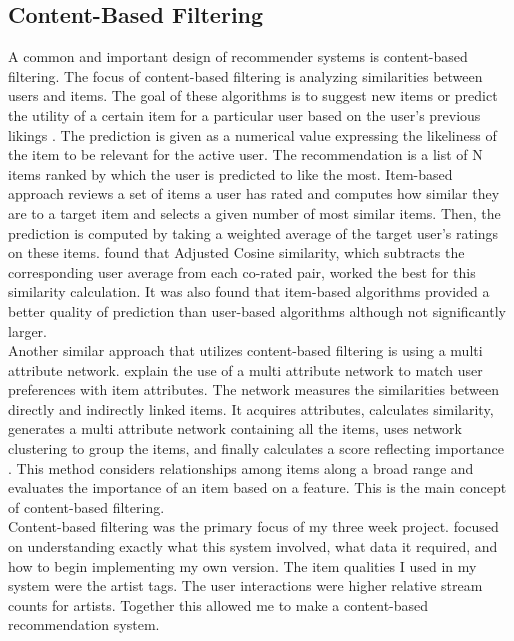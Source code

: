 \documentclass[10pt,twocolumn]{article}
\begin{document}
\subsection{Content-Based Filtering}
A common and important design of recommender systems is content-based filtering. The focus of content-based filtering is analyzing similarities between users and items. The goal of these algorithms is to suggest new items or predict the utility of a certain item for a particular user based on the user's previous likings \cite{SarwarItemCF}. The prediction is given as a numerical value expressing the likeliness of the item to be relevant for the active user. The recommendation is a list of N items ranked by which the user is predicted to like the most. Item-based approach reviews a set of items a user has rated and computes how similar they are to a target item and selects a given number of most similar items. Then, the prediction is computed by taking a weighted average of the target user's ratings on these items. \textcite{SarwarItemCF} found that Adjusted Cosine similarity, which subtracts the corresponding user average from each co-rated pair, worked the best for this similarity calculation. It was also found that item-based algorithms provided a better quality of prediction than user-based algorithms although not significantly larger\cite{SarwarItemCF}.\\

\indent Another similar approach that utilizes content-based filtering is using a multi attribute network. \textcite{SonContentFiltering} explain the use of a multi attribute network to match user preferences with item attributes. The network measures the similarities between directly and indirectly linked items. It acquires attributes, calculates similarity, generates a multi attribute network containing all the items, uses network clustering to group the items, and finally calculates a score reflecting importance \cite{SonContentFiltering}. This method considers relationships among items along a broad range and evaluates the importance of an item based on a feature. This is the main concept of content-based filtering.\\

\indent Content-based filtering was the primary focus of my three week project. focused on understanding exactly what this system involved, what data it required, and how to begin implementing my own version. The item qualities I used in my system were the artist tags. The user interactions were higher relative stream counts for artists. Together this allowed me to make a content-based recommendation system. 
\end{document}

